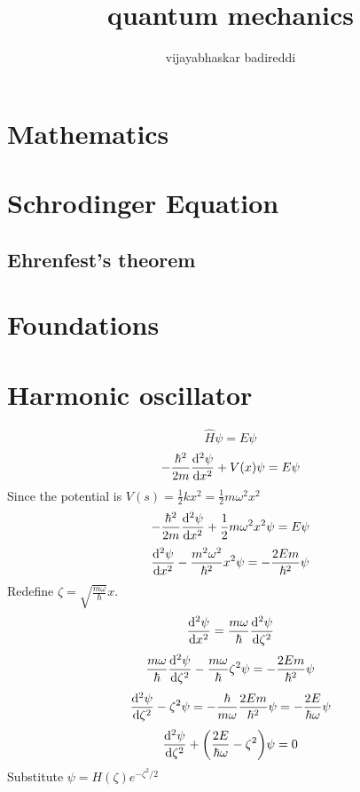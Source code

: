 \documentclass[12pt]{article}
\title{quantum mechanics}
\author{vijayabhaskar badireddi}
\begin{document}
\section{Mathematics}
\section{Schrodinger Equation}
\subsection{Ehrenfest's theorem}

\section{Foundations}
\section{Harmonic oscillator}
\[\hat{H}\psi=E\psi\]
\[-\frac{\hbar^2}{2m}\dv[2]{\psi}{x}+V(x)\psi=E\psi\]
Since the potential is $V(s)=\frac{1}{2}kx^2=\frac{1}{2}m\omega^2x^2$
\[-\frac{\hbar^2}{2m}\dv[2]{\psi}{x}+\frac{1}{2}m\omega^2x^2\psi=E\psi\]
\[\dv[2]{\psi}{x}-\frac{m^2\omega^2}{\hbar^2}x^2\psi=-\frac{2Em}{\hbar^2}\psi\]
Redefine $\zeta=\sqrt{\frac{m\omega}{\hbar}}x$.
\[\dv[2]{\psi}{x}=\frac{m\omega}{\hbar}\dv[2]{\psi}{\zeta}\]
\[\frac{m\omega}{\hbar}\dv[2]{\psi}{\zeta}-\frac{m\omega}{\hbar}\zeta^2\psi=-\frac{2Em}{\hbar^2}\psi\]
\[\dv[2]{\psi}{\zeta}-\zeta^2\psi=-\frac{\hbar}{m\omega}\frac{2Em}{\hbar^2}\psi=-\frac{2E}{\hbar\omega}\psi\]
\[\dv[2]{\psi}{\zeta}+\qty(\frac{2E}{\hbar\omega}-\zeta^2)\psi=0\]
Substitute $\psi=H(\zeta)e^{-\zeta^2/2}$	
\end{document}
